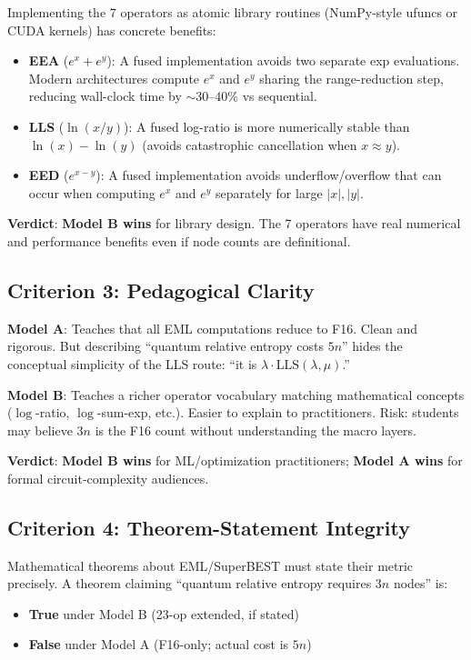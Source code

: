 \documentclass[11pt]{article}
\begin{document}
Implementing the 7 operators as atomic library routines (NumPy-style ufuncs or CUDA kernels)
has concrete benefits:

\begin{itemize}
  \item \textbf{EEA} ($e^x+e^y$): A fused implementation avoids two separate exp evaluations.
    Modern architectures compute $e^x$ and $e^y$ sharing the range-reduction step,
    reducing wall-clock time by $\sim30$--$40\%$ vs sequential.
  \item \textbf{LLS} ($\ln(x/y)$): A fused log-ratio is more numerically stable than
    $\ln(x)-\ln(y)$ (avoids catastrophic cancellation when $x\approx y$).
  \item \textbf{EED} ($e^{x-y}$): A fused implementation avoids underflow/overflow that
    can occur when computing $e^x$ and $e^y$ separately for large $|x|,|y|$.
\end{itemize}

\textbf{Verdict}: \textbf{Model B wins} for library design.
The 7 operators have real numerical and performance benefits even if node counts
are definitional.

\subsection{Criterion 3: Pedagogical Clarity}

\textbf{Model A}: Teaches that all EML computations reduce to F16. Clean and rigorous.
But describing ``quantum relative entropy costs $5n$'' hides the
conceptual simplicity of the LLS route: ``it is $\lambda\cdot\mathrm{LLS}(\lambda,\mu)$.''

\textbf{Model B}: Teaches a richer operator vocabulary matching mathematical concepts
($\log$-ratio, $\log$-sum-exp, etc.). Easier to explain to practitioners.
Risk: students may believe $3n$ is the F16 count without understanding the macro layers.

\textbf{Verdict}: \textbf{Model B wins} for ML/optimization practitioners;
\textbf{Model A wins} for formal circuit-complexity audiences.

\subsection{Criterion 4: Theorem-Statement Integrity}

Mathematical theorems about EML/SuperBEST must state their metric precisely.
A theorem claiming ``quantum relative entropy requires $3n$ nodes'' is:
\begin{itemize}
  \item \textbf{True} under Model B (23-op extended, if stated)
  \item \textbf{False} under Model A (F16-only; actual cost is $5n$)
\end{itemize}
\end{document}
